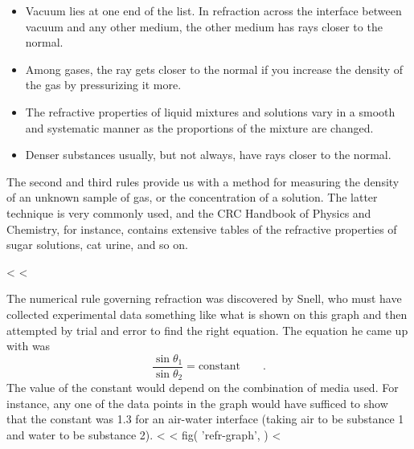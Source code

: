 \begin{itemize}

\item Vacuum lies at one end of the list. In refraction across
the interface between vacuum and any other medium, the other
medium has rays closer to the normal.

\item Among gases, the ray gets closer to the normal if you
increase the density of the gas by pressurizing it more.

\item The refractive properties of liquid mixtures and solutions
vary in a smooth and systematic manner as the proportions of
the mixture are changed.

\item Denser substances usually, but not always, have rays
closer to the normal.

\end{itemize}

The second and third rules provide us with a method for
measuring the density of an unknown sample of gas, or the
concentration of a solution. The latter technique is very
commonly used, and the CRC Handbook of Physics and
Chemistry, for instance, contains extensive tables of the
refractive properties of sugar solutions, cat urine, and so on.

<%
<%

The numerical rule governing refraction was discovered by
Snell, who must have collected experimental data something
like what is shown on this graph and then attempted by trial
and error to find the right equation. The equation he came up with was
\begin{equation*}
        \frac{\sin\theta_1}{\sin\theta_2}          =  \text{constant}   \qquad   .
\end{equation*}
The value of the constant would depend on the combination of
media used. For instance, any one of the data points in the
graph would have sufficed to show that the constant was 1.3
for an air-water interface (taking air to be substance 1 and
water to be substance 2).
<%
<%
  fig(
    'refr-graph',
  )
<%

